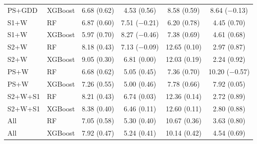 \begin{table}[htbp]
\begin{tabular}{l l c c c c}
PS+GDD & XGBoost & 6.68 (0.62) & 4.53 (0.56) & 8.58 (0.59) & 8.64 ($-$0.13) \\
S1+W & RF & 6.87 (0.60) & 7.51 ($-$0.21) & 6.20 (0.78) & 4.45 (0.70) \\
S1+W & XGBoost & 5.97 (0.70) & 8.27 ($-$0.46) & 7.38 (0.69) & 4.61 (0.68) \\
S2+W & RF & 8.18 (0.43) & 7.13 ($-$0.09) & 12.65 (0.10) & 2.97 (0.87) \\
S2+W & XGBoost & 9.05 (0.30) & 6.81 (0.00) & 12.03 (0.19) & 2.24 (0.92) \\
PS+W & RF & 6.68 (0.62) & 5.05 (0.45) & 7.36 (0.70) & 10.20 ($-$0.57) \\
PS+W & XGBoost & 7.26 (0.55) & 5.00 (0.46) & 7.78 (0.66) & 7.92 (0.05) \\
S2+W+S1 & RF & 8.21 (0.43) & 6.74 (0.03) & 12.36 (0.14) & 2.72 (0.89) \\
S2+W+S1 & XGBoost & 8.38 (0.40) & 6.46 (0.11) & 12.60 (0.11) & 2.80 (0.88) \\
All & RF & 7.05 (0.58) & 5.30 (0.40) & 10.67 (0.36) & 3.63 (0.80) \\
All & XGBoost & 7.92 (0.47) & 5.24 (0.41) & 10.14 (0.42) & 4.54 (0.69) \\
\bottomrule
\end{tabular}
\end{table}
